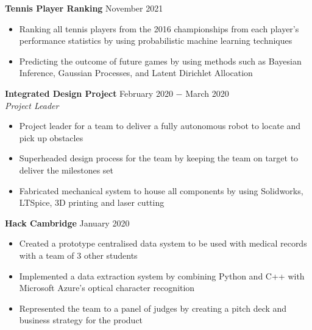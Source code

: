 \documentclass{article}
\begin{document}
\textbf{Tennis Player Ranking} \hfill November 2021
\begin{itemize}
    \item Ranking all tennis players from the 2016 championships from each player's performance statistics by using probabilistic machine learning techniques
    \item Predicting the outcome of future games by using methods such as Bayesian Inference, Gaussian Processes, and Latent Dirichlet Allocation
\end{itemize} \medskip


\textbf{Integrated Design Project} \hfill February 2020 $-$ March 2020\\
\textit{Project Leader}
\begin{itemize}
    \item Project leader for a team to deliver a fully autonomous robot to locate and pick up obstacles
    \item Superheaded design process for the team by keeping the team on target to deliver the milestones set
    \item Fabricated mechanical system to house all components by using Solidworks, LTSpice, 3D printing and laser cutting
\end{itemize} \medskip

\textbf{Hack Cambridge} \hfill January 2020
\begin{itemize}
    \item Created a prototype centralised data system to be used with medical records with a team of 3 other students
    \item Implemented a data extraction system by combining Python and C++ with Microsoft Azure’s optical character recognition 
    \item Represented the team to a panel of judges by creating a pitch deck and business strategy for the product
\end{itemize} \medskip
\end{document}
